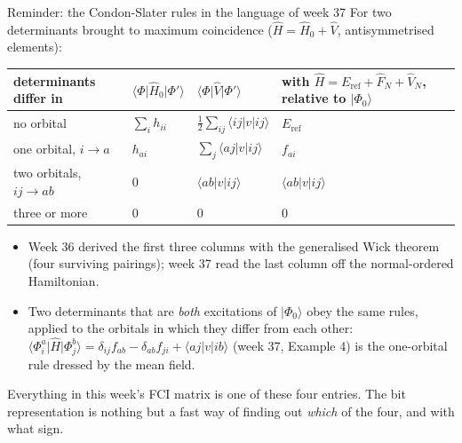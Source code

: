\documentclass[aspectratio=169,10pt]{beamer}
\newcommand{\mbbox}[1]{%
  \begin{tcolorbox}[colback=paleblue,colframe=uioblue,title={\bfseries Many-body connection}]
  #1
  \end{tcolorbox}}
\newcommand{\ket}[1]{\vert #1\rangle}
\newcommand{\bra}[1]{\langle #1\vert}
\newcommand{\element}[3]{\langle #1\vert #2\vert #3\rangle}
\begin{document}
\begin{frame}{Reminder: the Condon-Slater rules in the language of week 37}
  \footnotesize
  For two determinants brought to maximum coincidence ($\hat{H}=\hat{H}_0+\hat{V}$, antisymmetrised elements):
  \begin{center}\footnotesize
  \renewcommand{\arraystretch}{1.1}
  \begin{tabular}{llll}
    \toprule
    determinants differ in & $\element{\Phi}{\hat{H}_0}{\Phi'}$ & $\element{\Phi}{\hat{V}}{\Phi'}$ & with $\hat{H}=E_{\mathrm{ref}}+\hat{F}_N+\hat{V}_N$, relative to $\ket{\Phi_0}$\\
    \midrule
    no orbital & $\sum_i h_{ii}$ & $\frac12\sum_{ij}\element{ij}{v}{ij}$ & $E_{\mathrm{ref}}$\\
    one orbital, $i\to a$ & $h_{ai}$ & $\sum_j\element{aj}{v}{ij}$ & $f_{ai}$\\
    two orbitals, $ij\to ab$ & $0$ & $\element{ab}{v}{ij}$ & $\element{ab}{v}{ij}$\\
    three or more & $0$ & $0$ & $0$\\
    \bottomrule
  \end{tabular}
  \end{center}
  \begin{itemize}
    \item Week 36 derived the first three columns with the generalised Wick theorem (four surviving pairings); week 37 read the last column off the normal-ordered Hamiltonian.
    \item Two determinants that are \emph{both} excitations of $\ket{\Phi_0}$ obey the same rules, applied to the orbitals in which they differ from each other: $\bra{\Phi_i^a}\hat{H}\ket{\Phi_j^b}=\delta_{ij}f_{ab}-\delta_{ab}f_{ji}+\element{aj}{v}{ib}$ (week 37, Example 4) is the one-orbital rule dressed by the mean field.
  \end{itemize}
  \mbbox{\footnotesize Everything in this week's FCI matrix is one of these four entries. The bit representation is nothing but a fast way of finding out \emph{which} of the four, and with what sign.}
\end{frame}
\end{document}
